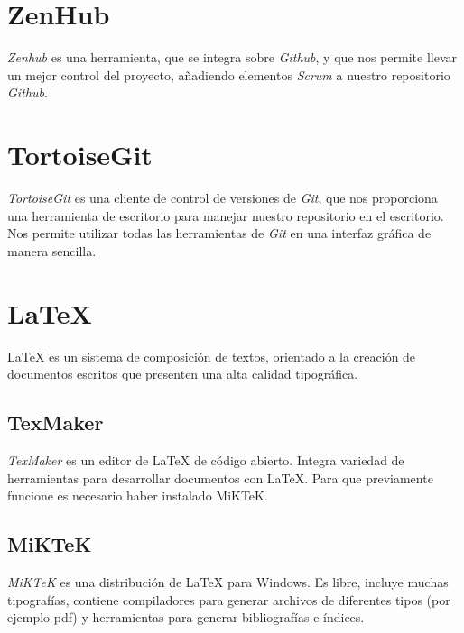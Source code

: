 \section{ZenHub}
\textit{Zenhub} es una herramienta, que se integra sobre \textit{Github}, y que nos permite llevar un mejor control del proyecto, añadiendo elementos \textit{Scrum} a nuestro repositorio \textit{Github}.

\section{TortoiseGit}
\textit{TortoiseGit} es una cliente de control de versiones de \textit{Git}, que nos proporciona una herramienta de escritorio para manejar nuestro repositorio en el escritorio. Nos permite utilizar todas las herramientas de \textit{Git} en una interfaz gráfica de manera sencilla.

\section{\LaTeX}
\LaTeX{} es un sistema de composición de textos, orientado a la creación de documentos escritos que presenten una alta calidad tipográfica. \cite{wiki:latex} 

\subsection{TexMaker}
\textit{TexMaker} es un editor de \LaTeX{} de código abierto. Integra variedad de herramientas para desarrollar documentos con \LaTeX. Para que previamente funcione es necesario haber instalado MiKTeK.

\subsection{MiKTeK}
\textit{MiKTeK} es una distribución de \LaTeX{} para Windows. Es libre, incluye muchas tipografías, contiene compiladores para generar archivos de diferentes tipos (por ejemplo pdf) y herramientas para generar bibliografías e índices.
